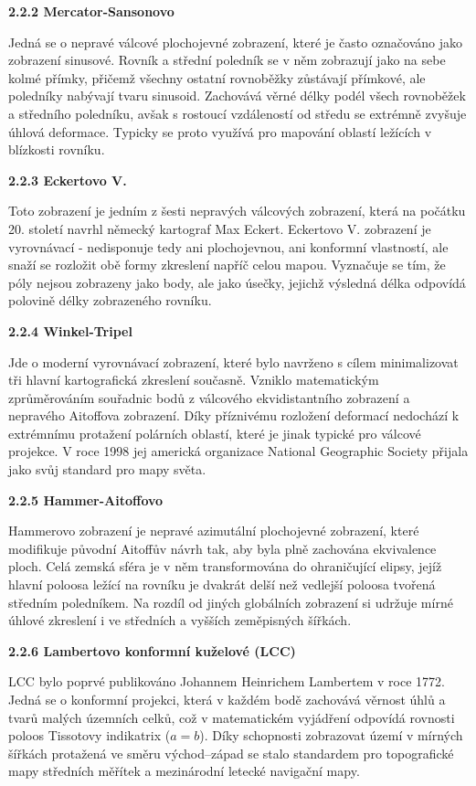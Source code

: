 \documentclass[12pt]{article}
\begin{document}
\textbf{2.2.2 Mercator-Sansonovo}

Jedná se o nepravé válcové plochojevné zobrazení, které je často označováno jako zobrazení sinusové. Rovník a střední poledník se v něm zobrazují jako na sebe kolmé přímky, přičemž všechny ostatní rovnoběžky zůstávají přímkové, ale poledníky nabývají tvaru sinusoid. Zachovává věrné délky podél všech rovnoběžek a středního poledníku, avšak s rostoucí vzdáleností od středu se extrémně zvyšuje úhlová deformace. Typicky se proto využívá pro mapování oblastí ležících v blízkosti rovníku.

\textbf{2.2.3 Eckertovo V.}

Toto zobrazení je jedním z šesti nepravých válcových zobrazení, která na počátku 20. století navrhl německý kartograf Max Eckert. Eckertovo V. zobrazení je vyrovnávací - nedisponuje tedy ani plochojevnou, ani konformní vlastností, ale snaží se rozložit obě formy zkreslení napříč celou mapou. Vyznačuje se tím, že póly nejsou zobrazeny jako body, ale jako úsečky, jejichž výsledná délka odpovídá polovině délky zobrazeného rovníku.

\newpage
\textbf{2.2.4 Winkel-Tripel}

Jde o moderní vyrovnávací zobrazení, které bylo navrženo s cílem minimalizovat tři hlavní kartografická zkreslení současně. Vzniklo matematickým zprůměrováním souřadnic bodů z válcového ekvidistantního zobrazení a nepravého Aitoffova zobrazení. Díky příznivému rozložení deformací nedochází k extrémnímu protažení polárních oblastí, které je jinak typické pro válcové projekce. V roce 1998 jej americká organizace National Geographic Society přijala jako svůj standard pro mapy světa.

\textbf{2.2.5 Hammer-Aitoffovo}

Hammerovo zobrazení je nepravé azimutální plochojevné zobrazení, které modifikuje původní Aitoffův návrh tak, aby byla plně zachována ekvivalence ploch. Celá zemská sféra je v něm transformována do ohraničující elipsy, jejíž hlavní poloosa ležící na rovníku je dvakrát delší než vedlejší poloosa tvořená středním poledníkem. Na rozdíl od jiných globálních zobrazení si udržuje mírné úhlové zkreslení i ve středních a vyšších zeměpisných šířkách.

\textbf{2.2.6 Lambertovo konformní kuželové (LCC)}

LCC bylo poprvé publikováno Johannem Heinrichem Lambertem v roce 1772. Jedná se o konformní projekci, která v každém bodě zachovává věrnost úhlů a tvarů malých územních celků, což v matematickém vyjádření odpovídá rovnosti poloos Tissotovy indikatrix ($a=b$). Díky schopnosti zobrazovat území v mírných šířkách protažená ve směru východ–západ se stalo standardem pro topografické mapy středních měřítek a mezinárodní letecké navigační mapy.
\end{document}
